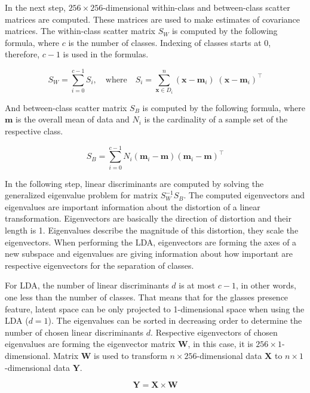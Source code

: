 In the next step, $256\times 256$-dimensional within-class and between-class scatter matrices are computed. These matrices are used to make estimates of covariance matrices. The within-class scatter matrix $S_W$ is computed by the following formula, where $c$ is the number of classes. Indexing of classes starts at 0, therefore, $c-1$ is used in the formulas.

$$
S_W = \sum\limits_{i=0}^{c-1}  S_i
,\quad \text{where} \quad
S_i = \sum\limits_{\pmb x \in D_i}^n (\pmb x - \pmb m_i)\;(\pmb x - \pmb m_i)^\top
$$

\noindent And between-class scatter matrix $S_B$ is computed by the following formula, where $\pmb m$ is the overall mean of data and $N_i$ is the cardinality of a sample set of the respective class.

$$
S_B = \sum\limits_{i=0}^{c-1} N_{i} (\pmb m_i - \pmb m) (\pmb m_i - \pmb m)^\top
$$

In the following step, linear discriminants are computed by solving the generalized eigenvalue problem for matrix $S^{-1}_W S_B$. The computed eigenvectors and eigenvalues are important information about the distortion of a linear transformation. Eigenvectors are basically the direction of distortion and their length is 1. Eigenvalues describe the magnitude of this distortion, they scale the eigenvectors. When performing the LDA, eigenvectors are forming the axes of a new subspace and eigenvalues are giving information about how important are respective eigenvectors for the separation of classes.

For LDA, the number of linear discriminants $d$ is at most $c-1$, in other words, one less than the number of classes. That means that for the glasses presence feature, latent space can be only projected to 1-dimensional space when using the LDA ($d=1$). The eigenvalues can be sorted in decreasing order to determine the number of chosen linear discriminants $d$. Respective eigenvectors of chosen eigenvalues are forming the eigenvector matrix $\pmb W$, in this case, it is $256\times 1$-dimensional. Matrix $\pmb W$ is used to transform $n\times 256$-dimensional data $\pmb X$ to $n\times 1$-dimensional data $\pmb Y$.

$$
\pmb Y = \pmb X \times \pmb W
$$


